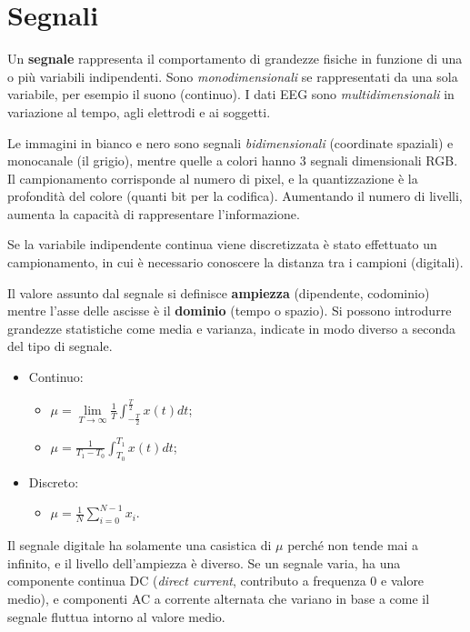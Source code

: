 \section{Segnali}
Un \textbf{segnale} rappresenta il comportamento di grandezze fisiche in funzione di una o più variabili indipendenti. Sono \textit{monodimensionali} se rappresentati da una sola variabile, per esempio il suono (continuo). I dati EEG sono \textit{multidimensionali} in variazione al tempo, agli elettrodi e ai soggetti.

Le immagini in bianco e nero sono segnali \textit{bidimensionali} (coordinate spaziali) e monocanale (il grigio), mentre quelle a colori hanno 3 segnali dimensionali RGB. Il campionamento corrisponde al numero di pixel, e la quantizzazione è la profondità del colore (quanti bit per la codifica). Aumentando il numero di livelli, aumenta la capacità di rappresentare l'informazione.

Se la variabile indipendente continua viene discretizzata è stato effettuato un campionamento, in cui è necessario conoscere la distanza tra i campioni (digitali). 

Il valore assunto dal segnale si definisce \textbf{ampiezza} (dipendente, codominio) mentre l'asse delle ascisse è il \textbf{dominio} (tempo o spazio). Si possono introdurre grandezze statistiche come media e varianza, indicate in modo diverso a seconda del tipo di segnale.

\begin{itemize}
	\item Continuo:
	\begin{itemize}
		\item $\mu = \lim\limits_{T \rightarrow \infty} \frac{1}{T} \int_{-\frac{T}{2}}^{\frac{T}{2}} x(t) dt$;
		\item $\mu = \frac{1}{T_1 - T_0} \int_{T_0}^{T_1} x(t) dt$;
	\end{itemize}
	\item Discreto:
	\begin{itemize}
		\item $\mu = \frac{1}{N} \sum_{i = 0}^{N - 1} x_i$.
	\end{itemize}
\end{itemize}

Il segnale digitale ha solamente una casistica di $\mu$ perché non tende mai a infinito, e il livello dell'ampiezza è diverso. Se un segnale varia, ha una componente continua DC (\textit{direct current}, contributo a frequenza 0 e valore medio), e componenti AC a corrente alternata che variano in base a come il segnale fluttua intorno al valore medio.

